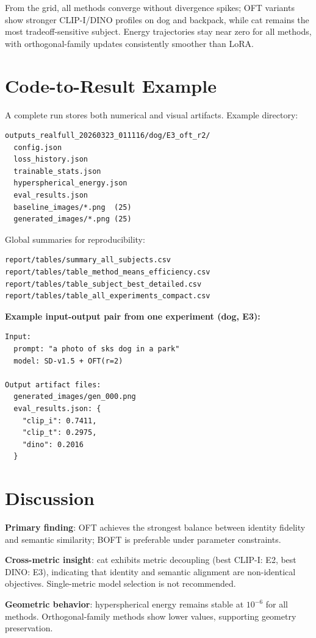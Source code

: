 \documentclass[10pt,twocolumn]{article}
\begin{document}
From the grid, all methods converge without divergence spikes; OFT variants
show stronger CLIP-I/DINO profiles on dog and backpack, while cat remains the
most tradeoff-sensitive subject. Energy trajectories stay near zero for all
methods, with orthogonal-family updates consistently smoother than LoRA.

\section{Code-to-Result Example}
A complete run stores both numerical and visual artifacts. Example directory:
\begin{lstlisting}[style=compact]
outputs_realfull_20260323_011116/dog/E3_oft_r2/
  config.json
  loss_history.json
  trainable_stats.json
  hyperspherical_energy.json
  eval_results.json
  baseline_images/*.png  (25)
  generated_images/*.png (25)
\end{lstlisting}

Global summaries for reproducibility:
\begin{lstlisting}[style=compact]
report/tables/summary_all_subjects.csv
report/tables/table_method_means_efficiency.csv
report/tables/table_subject_best_detailed.csv
report/tables/table_all_experiments_compact.csv
\end{lstlisting}

\textbf{Example input-output pair from one experiment (dog, E3):}
\begin{lstlisting}[style=compact]
Input:
  prompt: "a photo of sks dog in a park"
  model: SD-v1.5 + OFT(r=2)

Output artifact files:
  generated_images/gen_000.png
  eval_results.json: {
    "clip_i": 0.7411,
    "clip_t": 0.2975,
    "dino": 0.2016
  }
\end{lstlisting}

\section{Discussion}
\textbf{Primary finding}: OFT achieves the strongest balance between identity fidelity and semantic similarity; BOFT is preferable under parameter constraints.

\textbf{Cross-metric insight}: cat exhibits metric decoupling (best CLIP-I: E2, best DINO: E3), indicating that identity and semantic alignment are non-identical objectives. Single-metric model selection is not recommended.

\textbf{Geometric behavior}: hyperspherical energy remains stable at $10^{-6}$ for all methods. Orthogonal-family methods show lower values, supporting geometry preservation.
\end{document}

